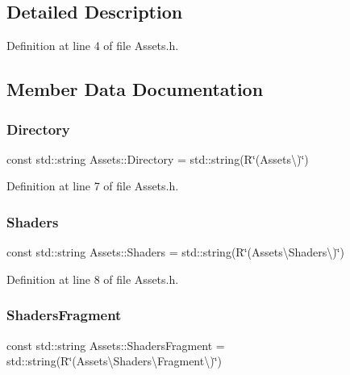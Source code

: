 \subsection{Detailed Description}


Definition at line 4 of file Assets.\+h.



\subsection{Member Data Documentation}
\mbox{\label{classAssets_a2b541c116af365350c686285cb115d07}} 
\subsubsection{\texorpdfstring{Directory}{Directory}}
{\footnotesize\ttfamily const std\+::string Assets\+::\+Directory = std\+::string(R\char`\"{}(Assets\textbackslash{})\char`\"{})\hspace{0.3cm}{\ttfamily [static]}}



Definition at line 7 of file Assets.\+h.

\mbox{\label{classAssets_af94075606cda6aef8b4bdcbe17169af3}} 
\subsubsection{\texorpdfstring{Shaders}{Shaders}}
{\footnotesize\ttfamily const std\+::string Assets\+::\+Shaders = std\+::string(R\char`\"{}(Assets\textbackslash{}\+Shaders\textbackslash{})\char`\"{})\hspace{0.3cm}{\ttfamily [static]}}



Definition at line 8 of file Assets.\+h.

\mbox{\label{classAssets_abb1ca75a8a9c7b942232df4aff9bb6c9}} 
\subsubsection{\texorpdfstring{Shaders\+Fragment}{ShadersFragment}}
{\footnotesize\ttfamily const std\+::string Assets\+::\+Shaders\+Fragment = std\+::string(R\char`\"{}(Assets\textbackslash{}\+Shaders\textbackslash{}\+Fragment\textbackslash{})\char`\"{})\hspace{0.3cm}{\ttfamily [static]}}



